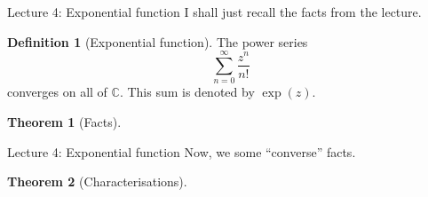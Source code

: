 \documentclass[dvipsnames]{beamer}
\theoremstyle{definition}
\newtheorem{defn}{Definition}
\newtheorem{thm}{Theorem}
\begin{document}
\begin{frame}{Lecture 4: Exponential function}
    I shall just recall the facts from the lecture.
    \begin{defn}[Exponential function]
        The power series
        \begin{equation*} 
            \sum_{n = 0}^{\infty}\dfrac{z^n}{n!}
        \end{equation*}
        converges on all of $\mathbb{C}.$ This sum is denoted by $\exp(z).$
    \end{defn}
    \begin{thm}[Facts]
        \begin{enumerate}
        \end{enumerate}
    \end{thm}
\end{frame}
\begin{frame}{Lecture 4: Exponential function}
    Now, we some ``converse'' facts.
    \begin{thm}[Characterisations]
        \begin{enumerate}
        \end{enumerate}
    \end{thm}
\end{frame}
\end{document}
